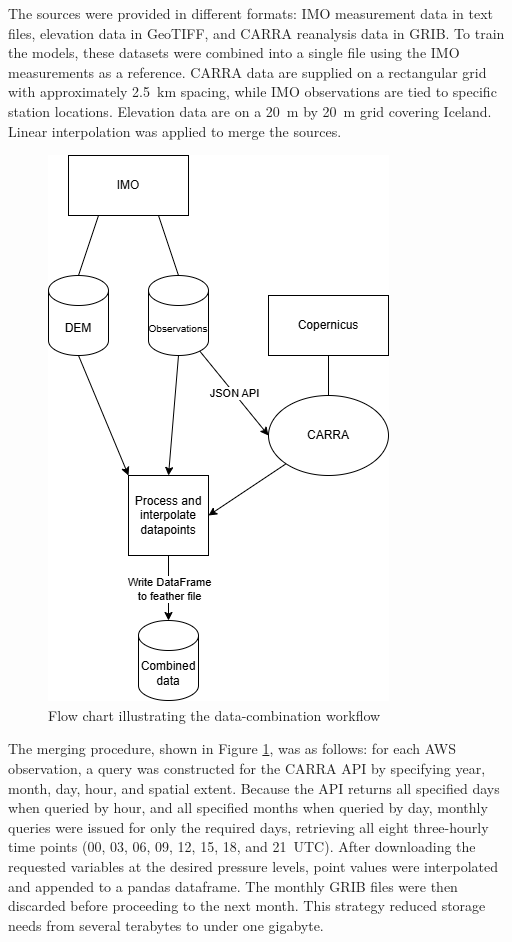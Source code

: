 The sources were provided in different formats: IMO measurement data in text files, elevation data in GeoTIFF, and CARRA reanalysis data in GRIB. To train the models, these datasets were combined into a single file using the IMO measurements as a reference. CARRA data are supplied on a rectangular grid with approximately 2.5~km spacing, while IMO observations are tied to specific station locations. Elevation data are on a 20~m by 20~m grid covering Iceland. Linear interpolation was applied to merge the sources.

\begin{figure}[h]
  \centering
  \includegraphics[scale=0.6]{Figures/data_combination.drawio.png}
  \caption{Flow chart illustrating the data-combination workflow}
  \label{fig:data_preprocessing_flow_chart}
\end{figure}

The merging procedure, shown in Figure \ref{fig:data_preprocessing_flow_chart}, was as follows: for each AWS observation, a query was constructed for the CARRA API by specifying year, month, day, hour, and spatial extent. Because the API returns all specified days when queried by hour, and all specified months when queried by day, monthly queries were issued for only the required days, retrieving all eight three-hourly time points (00, 03, 06, 09, 12, 15, 18, and 21~UTC). After downloading the requested variables at the desired pressure levels, point values were interpolated and appended to a pandas dataframe. The monthly GRIB files were then discarded before proceeding to the next month. This strategy reduced storage needs from several terabytes to under one gigabyte.

